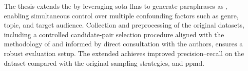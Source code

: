 The thesis extends the \impAppr{} by leveraging \acl{sota} \acp{llm} to generate paraphrases as \imps{}, enabling simultaneous control over multiple confounding factors such as genre, topic, and target audience. 
Collection and preprocessing of the original datasets, including a controlled candidate-pair selection procedure aligned with the methodology of \citet{koppel_determining_2014} and informed by direct consultation with the authors, ensures a robust evaluation setup. 
The extended \impAppr{} achieves improved precision–recall on the \dataStudent{} dataset compared with the original sampling strategies, \unmasking{} and \acs{ppmd}.

